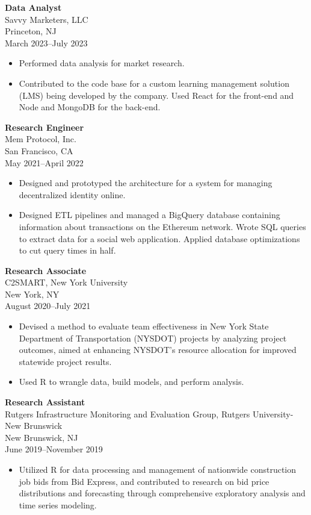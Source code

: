 \documentclass[letterpaper,11pt]{article}
\begin{document}
\textbf{Data Analyst} \\
Savvy Marketers, LLC \\
Princeton, NJ \\
March 2023--July 2023
\begin{itemize}
  \item Performed data analysis for market research.
  \item Contributed to the code base for a custom learning management solution (LMS) being developed by the company.
        Used React for the front-end and Node and MongoDB for the back-end.
\end{itemize}

\textbf{Research Engineer} \\
Mem Protocol, Inc. \\
San Francisco, CA \\
May 2021--April 2022
\begin{itemize}
  \item Designed and prototyped the architecture for a system for managing decentralized identity online.
  \item Designed ETL pipelines and managed a BigQuery database containing information about transactions on the Ethereum
        network. Wrote SQL queries to extract data for a social web application. Applied database optimizations to cut
        query times in half.
\end{itemize}

\textbf{Research Associate} \\
C2SMART, New York University \\
New York, NY \\
August 2020--July 2021
\begin{itemize}
  \item Devised a method to evaluate team effectiveness in New York State Department of Transportation (NYSDOT) projects
        by analyzing project outcomes, aimed at enhancing NYSDOT's resource allocation for improved statewide project
        results.
  \item Used R to wrangle data, build models, and perform analysis.
\end{itemize}

\textbf{Research Assistant} \\
Rutgers Infrastructure Monitoring and Evaluation Group, Rutgers University-New Brunswick \\
New Brunswick, NJ \\
June 2019--November 2019
\begin{itemize}
  \item Utilized R for data processing and management of nationwide construction job bids from Bid Express, and
        contributed to research on bid price distributions and forecasting through comprehensive exploratory analysis
        and time series modeling.
\end{itemize}
\end{document}
